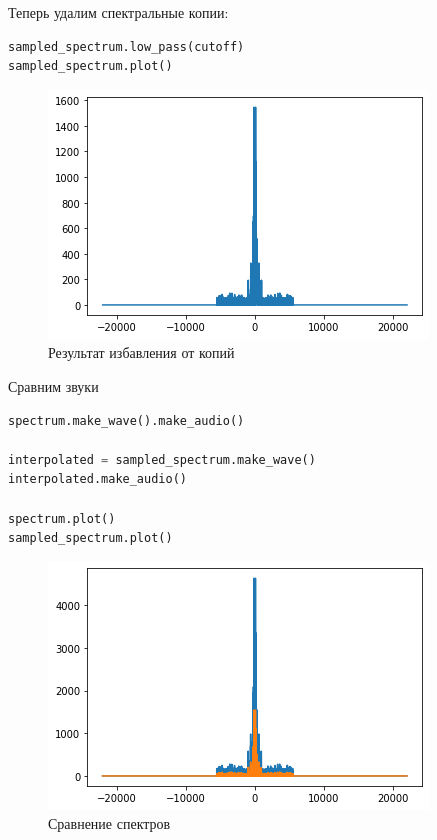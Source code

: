 Теперь удалим спектральные копии:
\begin{lstlisting}[language=Python]
sampled_spectrum.low_pass(cutoff)
sampled_spectrum.plot()
\end{lstlisting}
\begin{figure}[H]
	\begin{center}
		\includegraphics[scale=1]{fig/lab11/lab11_5.png}
		\caption{Результат избавления от копий}
	\end{center}
\end{figure}

Сравним звуки

\begin{lstlisting}[language=Python]
spectrum.make_wave().make_audio()

interpolated = sampled_spectrum.make_wave()
interpolated.make_audio()

spectrum.plot()
sampled_spectrum.plot()
\end{lstlisting}

\begin{figure}[H]
	\begin{center}
		\includegraphics[scale=1]{fig/lab11/lab11_6.png}
		\caption{Сравнение спектров}
	\end{center}
\end{figure}

